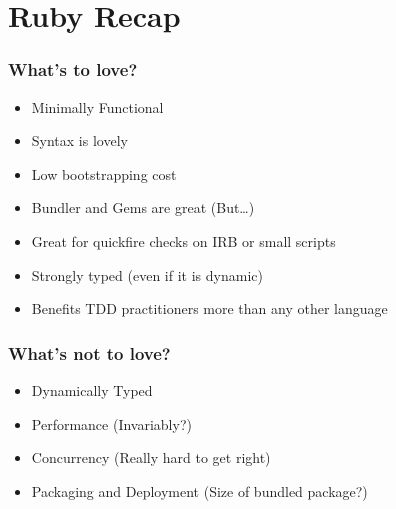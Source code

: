 \section{Ruby Recap}
\label{sec:ruby-recap}

\begin{frame}
  \frametitle{What's to love?}
  \begin{itemize}
  \item Minimally Functional
  \item Syntax is lovely
  \item Low bootstrapping cost
  \item Bundler and Gems are great (But\ldots)
  \item Great for quickfire checks on IRB or small scripts
  \item Strongly typed (even if it is dynamic)
  \item Benefits TDD practitioners more than any other language
  \end{itemize}
\end{frame}

\begin{frame}
  \frametitle{What's not to love?}
  \begin{itemize}
  \item Dynamically Typed
  \item Performance (Invariably?)
  \item Concurrency (Really hard to get right)
  \item Packaging and Deployment (Size of bundled package?)
  \end{itemize}
\end{frame}
